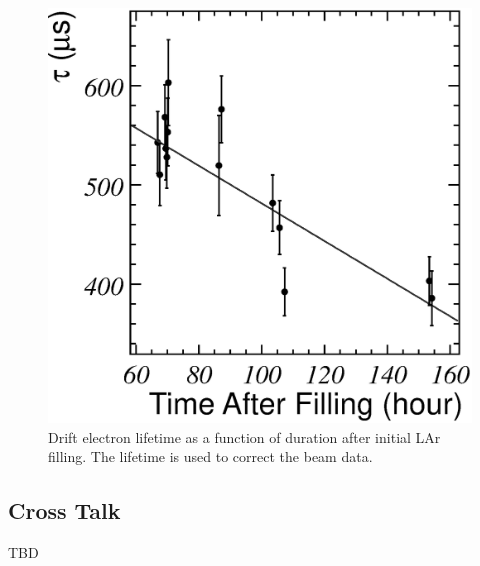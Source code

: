 
\begin{figure}[htbp]
 \begin{center}
  \includegraphics[width=1.0\hsize]{fig/tauHistory.eps}
 \end{center}
 \caption{Drift electron lifetime as a function of duration after initial LAr filling. The lifetime is used to correct the beam data.}
 \label{fig:CosmicPurity}
\end{figure}

\subsection{Cross Talk}

TBD

